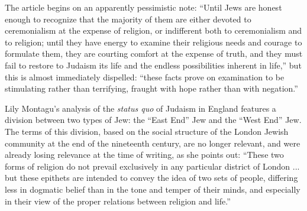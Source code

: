 \documentclass[12pt, extrafontsizes, twopage, a5paper]{memoir}
\begin{document}
The article begins on an apparently pessimistic note: ``Until Jews are honest enough to recognize that 
the majority of them are either devoted to ceremonialism at 
the expense of religion, or indifferent both to ceremonialism 
and to religion; until they have energy to examine their 
religious needs and courage to formulate them, they are 
courting comfort at the expense of truth, and they must fail 
to restore to Judaism its life and the endless possibilities 
inherent in life,'' but this is almost immediately dispelled: ``these facts prove on examination to be stimulating rather than terrifying, fraught with hope 
rather than with negation.''

Lily Montagu's analysis of the \textsl{status quo} of Judaism in England features a division between two types of Jew: the ``East End'' Jew and the ``West End'' Jew. The terms of this division, based on the social structure of the London Jewish community at the end of the nineteenth century, are no longer relevant, and were already losing relevance at the time of writing, as she points out: ``These two forms of religion do not prevail exclusively
in any particular district of London ... but these epithets are 
intended to convey the idea of two sets of people, differing 
less in dogmatic belief than in the tone and temper of 
their minds, and especially in their view of the proper 
relations between religion and life.''
\end{document}
